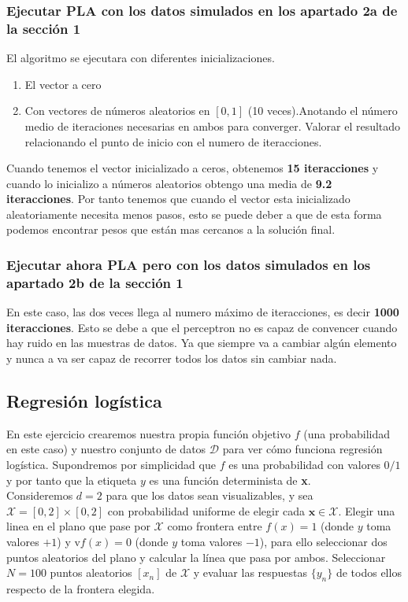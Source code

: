 \documentclass[12pt,a4paper]{article}
\begin{document}
\subsubsection{Ejecutar PLA con los datos simulados en los apartado 2a de la sección 1}
El algoritmo se ejecutara con diferentes inicializaciones.
\begin{enumerate}
	\item El vector a cero
	\item Con vectores de números aleatorios en $[0,1]$ (10 veces).Anotando el número medio de iteraciones necesarias en ambos para converger. Valorar el resultado relacionando el punto de inicio con el numero de iteracciones.
\end{enumerate}
Cuando tenemos el vector inicializado a ceros, obtenemos \textbf{15 iteracciones} y cuando lo inicializo a números aleatorios obtengo una media de \textbf{9.2 iteracciones}. Por tanto tenemos que cuando el vector esta inicializado aleatoriamente necesita menos pasos, esto se puede deber a que de esta forma podemos encontrar pesos que están mas cercanos a la solución final.
\subsubsection{Ejecutar ahora PLA pero con los datos simulados en los apartado 2b de la sección 1}
En este caso, las dos veces llega al numero máximo de iteracciones, es decir \textbf{1000 iteracciones}. Esto se debe a que el perceptron no es capaz de convencer cuando hay ruido en las muestras de datos. Ya que siempre va a cambiar algún elemento y nunca a va ser capaz de recorrer todos los datos sin cambiar nada.
\subsection{Regresión logística}
En este ejercicio crearemos nuestra propia función objetivo $f$ (una probabilidad en este caso) y nuestro conjunto de datos  $\mathcal{D}$ para ver cómo funciona regresión logística. Supondremos por simplicidad que $f$ es una probabilidad con valores $0/1$ y por tanto que la etiqueta $y$ es una función determinista de \textbf{x}.\\
Consideremos $d=2$ para que los datos sean visualizables, y sea $\mathcal{X}=[0,2] \times [0,2]$ con probabilidad uniforme de elegir cada $\mathbf{x} \in \mathcal{X}$. Elegir una linea en el plano que pase por $\mathcal{X}$ como frontera entre $f(x) = 1$ (donde $y$ toma valores $+1$) y v$f(x) = 0$ (donde $y$ toma valores $-1$), para ello seleccionar dos puntos aleatorios del plano y calcular la línea que pasa por ambos. Seleccionar $N=100$ puntos aleatorios $[x_n]$ de $\mathcal{X}$ y evaluar las respuestas $\{y_n\}$ de todos ellos respecto de la frontera elegida.
\end{document}
